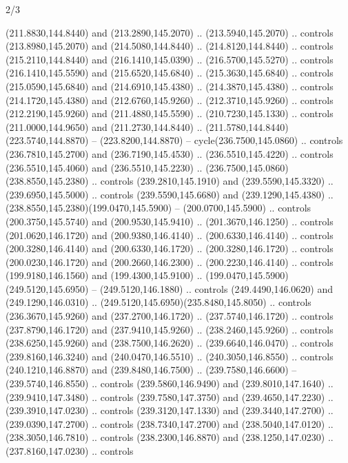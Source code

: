 \begin{flagdescription}{2/3}
\begin{scope}[xshift=0.5\flaglength,yshift=0.5\flagwidth,scale=\flagwidth/259.2]
\begin{scope}[y=0.8pt, x=0.8pt, yscale=-1,shift={(-243,-162)}]
      (211.8830,144.8440) and (213.2890,145.2070) .. (213.5940,145.2070) .. controls
      (213.8980,145.2070) and (214.5080,144.8440) .. (214.8120,144.8440) .. controls
      (215.2110,144.8440) and (216.1410,145.0390) .. (216.5700,145.5270) .. controls
      (216.1410,145.5590) and (215.6520,145.6840) .. (215.3630,145.6840) .. controls
      (215.0590,145.6840) and (214.6910,145.4380) .. (214.3870,145.4380) .. controls
      (214.1720,145.4380) and (212.6760,145.9260) .. (212.3710,145.9260) .. controls
      (212.2190,145.9260) and (211.4880,145.5590) .. (210.7230,145.1330) .. controls
      (211.0000,144.9650) and (211.2730,144.8440) ..
      (211.5780,144.8440)(223.5740,144.8870) -- (223.8200,144.8870) --
      cycle(236.7500,145.0860) .. controls (236.7810,145.2700) and
      (236.7190,145.4530) .. (236.5510,145.4220) .. controls (236.5510,145.4060) and
      (236.5510,145.2230) .. (236.7500,145.0860)(238.8550,145.2380) .. controls
      (239.2810,145.1910) and (239.5590,145.3320) .. (239.6950,145.5000) .. controls
      (239.5590,145.6680) and (239.1290,145.4380) ..
      (238.8550,145.2380)(199.0470,145.5900) -- (200.0700,145.5900) .. controls
      (200.3750,145.5740) and (200.9530,145.9410) .. (201.3670,146.1250) .. controls
      (201.0620,146.1720) and (200.9380,146.4140) .. (200.6330,146.4140) .. controls
      (200.3280,146.4140) and (200.6330,146.1720) .. (200.3280,146.1720) .. controls
      (200.0230,146.1720) and (200.2660,146.2300) .. (200.2230,146.4140) .. controls
      (199.9180,146.1560) and (199.4300,145.9100) ..
      (199.0470,145.5900)(249.5120,145.6950) -- (249.5120,146.1880) .. controls
      (249.4490,146.0620) and (249.1290,146.0310) ..
      (249.5120,145.6950)(235.8480,145.8050) .. controls (236.3670,145.9260) and
      (237.2700,146.1720) .. (237.5740,146.1720) .. controls (237.8790,146.1720) and
      (237.9410,145.9260) .. (238.2460,145.9260) .. controls (238.6250,145.9260) and
      (238.7500,146.2620) .. (239.6640,146.0470) .. controls (239.8160,146.3240) and
      (240.0470,146.5510) .. (240.3050,146.8550) .. controls (240.1210,146.8870) and
      (239.8480,146.7500) .. (239.7580,146.6600) -- (239.5740,146.8550) .. controls
      (239.5860,146.9490) and (239.8010,147.1640) .. (239.9410,147.3480) .. controls
      (239.7580,147.3750) and (239.4650,147.2230) .. (239.3910,147.0230) .. controls
      (239.3120,147.1330) and (239.3440,147.2700) .. (239.0390,147.2700) .. controls
      (238.7340,147.2700) and (238.5040,147.0120) .. (238.3050,146.7810) .. controls
      (238.2300,146.8870) and (238.1250,147.0230) .. (237.8160,147.0230) .. controls

\end{scope}
\end{scope}
\end{flagdescription}
